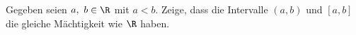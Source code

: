 \begin{prob}
  Gegeben seien $a,\ b \in \R$ mit $a < b$. Zeige, dass die Intervalle $(a,b)$
  und $[a,b]$ die gleiche Mächtigkeit wie $\R$ haben.
\end{prob}
